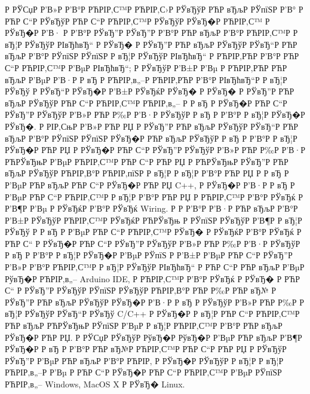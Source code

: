 \documentclass[a4paper,14pt]{extarticle}
\begin{document}
Р  РЎСџР  Р’В»Р  Р’В°Р РЋРІР‚С™Р РЋРІР‚С›Р  РЎвЂўР РЋР вЂљР  РЎпїЅР  Р’В° Р РЋР С“Р  РЎвЂўР РЋР С“Р РЋРІР‚С™Р  РЎвЂўР  РЎвЂ�Р РЋРІР‚С™ Р  РЎвЂ�Р  Р’В· Р  Р’В°Р  РЎвЂ”Р  РЎвЂ”Р  Р’В°Р РЋР вЂљР  Р’В°Р РЋРІР‚С™Р  Р вЂ¦Р  РЎвЂўР  РІвЂћвЂ“ Р  РЎвЂ� Р  РЎвЂ”Р РЋР вЂљР  РЎвЂўР  РЎвЂ“Р РЋР вЂљР  Р’В°Р  РЎпїЅР  РЎпїЅР  Р вЂ¦Р  РЎвЂўР  РІвЂћвЂ“ Р РЋРІР‚РЋР  Р’В°Р РЋР С“Р РЋРІР‚С™Р  Р’ВµР  РІвЂћвЂ“; Р  РЎвЂўР  Р’В±Р  Р’Вµ Р РЋРІР‚РЋР РЋР вЂљР  Р’ВµР  Р’В·Р  Р вЂ Р РЋРІР‚в„–Р РЋРІР‚РЋР  Р’В°Р  РІвЂћвЂ“Р  Р вЂ¦Р  РЎвЂў Р  РЎвЂ“Р  РЎвЂ�Р  Р’В±Р  РЎвЂќР  РЎвЂ� Р  РЎвЂ� Р  РЎвЂ”Р РЋР вЂљР  РЎвЂўР РЋР С“Р РЋРІР‚С™Р РЋРІР‚в„– Р  Р вЂ  Р  РЎвЂ�Р РЋР С“Р  РЎвЂ”Р  РЎвЂўР  Р’В»Р РЋР Р‰Р  Р’В·Р  РЎвЂўР  Р вЂ Р  Р’В°Р  Р вЂ¦Р  РЎвЂ�Р  РЎвЂ�. Р  РІР‚СњР  Р’В»Р РЋР РЏ Р  РЎвЂ”Р РЋР вЂљР  РЎвЂўР  РЎвЂ“Р РЋР вЂљР  Р’В°Р  РЎпїЅР  РЎпїЅР  РЎвЂ�Р РЋР вЂљР  РЎвЂўР  Р вЂ Р  Р’В°Р  Р вЂ¦Р  РЎвЂ�Р РЋР РЏ Р  РЎвЂ�Р РЋР С“Р  РЎвЂ”Р  РЎвЂўР  Р’В»Р РЋР Р‰Р  Р’В·Р РЋРЎвЂњР  Р’ВµР РЋРІР‚С™Р РЋР С“Р РЋР РЏ Р РЋРЎвЂњР  РЎвЂ”Р РЋР вЂљР  РЎвЂўР РЋРІР‚В°Р РЋРІР‚пїЅР  Р вЂ¦Р  Р вЂ¦Р  Р’В°Р РЋР РЏ Р  Р вЂ Р  Р’ВµР РЋР вЂљР РЋР С“Р  РЎвЂ�Р РЋР РЏ C++, Р  РЎвЂ�Р  Р’В·Р  Р вЂ Р  Р’ВµР РЋР С“Р РЋРІР‚С™Р  Р вЂ¦Р  Р’В°Р РЋР РЏ Р РЋРІР‚С™Р  Р’В°Р  РЎвЂќ Р  Р’В¶Р  Р’Вµ Р  РЎвЂќР  Р’В°Р  РЎвЂќ Wiring. Р   Р  Р’В°Р  Р’В·Р РЋР вЂљР  Р’В°Р  Р’В±Р  РЎвЂўР РЋРІР‚С™Р  РЎвЂќР РЋРЎвЂњ Р  РЎпїЅР  РЎвЂўР  Р’В¶Р  Р вЂ¦Р  РЎвЂў Р  Р вЂ Р  Р’ВµР РЋР С“Р РЋРІР‚С™Р  РЎвЂ� Р  РЎвЂќР  Р’В°Р  РЎвЂќ Р РЋР С“ Р  РЎвЂ�Р РЋР С“Р  РЎвЂ”Р  РЎвЂўР  Р’В»Р РЋР Р‰Р  Р’В·Р  РЎвЂўР  Р вЂ Р  Р’В°Р  Р вЂ¦Р  РЎвЂ�Р  Р’ВµР  РЎпїЅ Р  Р’В±Р  Р’ВµР РЋР С“Р  РЎвЂ”Р  Р’В»Р  Р’В°Р РЋРІР‚С™Р  Р вЂ¦Р  РЎвЂўР  РІвЂћвЂ“ Р РЋР С“Р РЋР вЂљР  Р’ВµР  РўвЂ�Р РЋРІР‚в„– Arduino IDE, Р РЋРІР‚С™Р  Р’В°Р  РЎвЂќ Р  РЎвЂ� Р РЋР С“ Р  РЎвЂ”Р  РЎвЂўР  РЎпїЅР  РЎвЂўР РЋРІР‚В°Р РЋР Р‰Р РЋР вЂ№ Р  РЎвЂ”Р РЋР вЂљР  РЎвЂўР  РЎвЂ�Р  Р’В·Р  Р вЂ Р  РЎвЂўР  Р’В»Р РЋР Р‰Р  Р вЂ¦Р  РЎвЂўР  РЎвЂ“Р  РЎвЂў C/C++ Р  РЎвЂ�Р  Р вЂ¦Р РЋР С“Р РЋРІР‚С™Р РЋР вЂљР РЋРЎвЂњР  РЎпїЅР  Р’ВµР  Р вЂ¦Р РЋРІР‚С™Р  Р’В°Р РЋР вЂљР  РЎвЂ�Р РЋР РЏ. Р  РЎСџР  РЎвЂўР  РўвЂ�Р  РўвЂ�Р  Р’ВµР РЋР вЂљР  Р’В¶Р  РЎвЂ�Р  Р вЂ Р  Р’В°Р РЋР вЂ№Р РЋРІР‚С™Р РЋР С“Р РЋР РЏ Р  РЎвЂўР  РЎвЂ”Р  Р’ВµР РЋР вЂљР  Р’В°Р РЋРІР‚ Р  РЎвЂ�Р  РЎвЂўР  Р вЂ¦Р  Р вЂ¦Р РЋРІР‚в„–Р  Р’Вµ Р РЋР С“Р  РЎвЂ�Р РЋР С“Р РЋРІР‚С™Р  Р’ВµР  РЎпїЅР РЋРІР‚в„– Windows, MacOS X Р  РЎвЂ� Linux.
\end{document}
